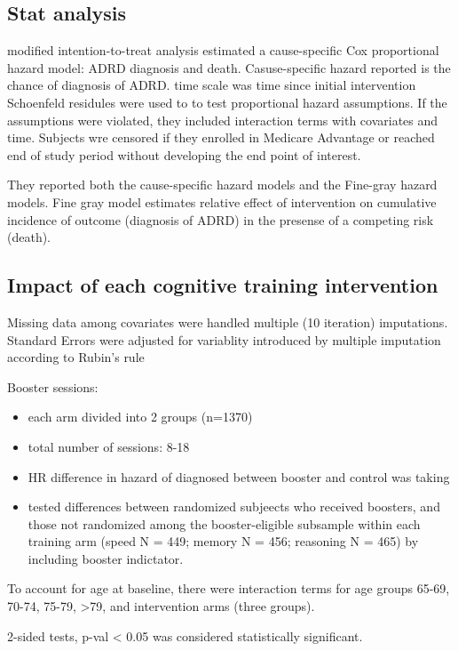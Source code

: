 \documentclass[11pt]{article}
\begin{document}
\subsection{Stat analysis}
\label{sec:org576903e}

modified intention-to-treat analysis estimated a cause-specific Cox proportional hazard model: ADRD diagnosis and death. Casuse-specific hazard reported is the chance of diagnosis of ADRD. time scale was time since initial intervention
Schoenfeld residules were used to to test proportional hazard assumptions. If the assumptions were violated, they included interaction terms with covariates and time. Subjects wre censored if they enrolled in Medicare Advantage or reached end of study period without developing the end point of interest.

They reported both the cause-specific hazard models and the Fine-gray hazard models. Fine gray model estimates relative effect of intervention on cumulative incidence of outcome (diagnosis of ADRD) in the presense of a competing risk (death).

\subsection{Impact of each cognitive training intervention}
\label{sec:org40549eb}

Missing data among covariates were handled multiple (10 iteration) imputations. Standard Errors were adjusted for variablity introduced by multiple imputation according to Rubin's rule

Booster sessions:
\begin{itemize}
\item each arm divided into 2 groups (n=1370)
\item total number of sessions: 8-18
\item HR difference in hazard of diagnosed between booster and control was taking
\item tested differences between randomized subjeects who received boosters, and those not randomized among the booster-eligible subsample within each training arm (speed N = 449; memory N = 456; reasoning N = 465) by including booster indictator.
\end{itemize}

To account for age at baseline, there were interaction terms for age groups 65-69, 70-74, 75-79, >79, and intervention arms (three groups).

2-sided tests, p-val < 0.05 was considered statistically significant.
\end{document}
